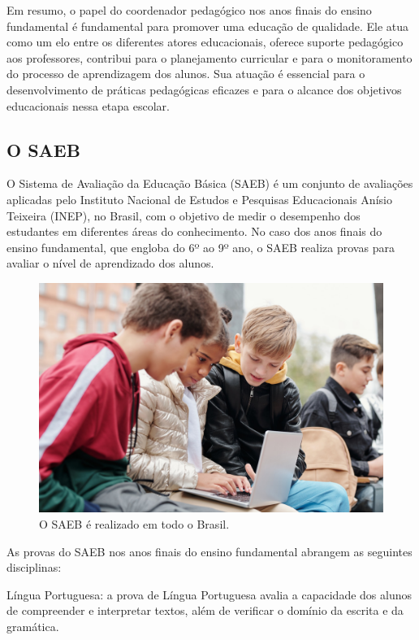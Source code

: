 Em resumo, o papel do coordenador pedagógico nos anos finais do ensino fundamental é fundamental para promover uma educação de qualidade. Ele atua como um elo entre os diferentes atores educacionais, oferece suporte pedagógico aos professores, contribui para o planejamento curricular e para o monitoramento do processo de aprendizagem dos alunos. Sua atuação é essencial para o desenvolvimento de práticas pedagógicas eficazes e para o alcance dos objetivos educacionais nessa etapa escolar.

\subsection{O SAEB}\label{o-saeb}

O Sistema de Avaliação da Educação Básica (SAEB) é um conjunto de avaliações aplicadas pelo Instituto Nacional de Estudos e Pesquisas Educacionais Anísio Teixeira (INEP), no Brasil, com o objetivo de medir o desempenho dos estudantes em diferentes áreas do conhecimento. No caso dos anos finais do ensino fundamental, que engloba do 6º ao 9º ano, o SAEB realiza provas para avaliar o nível de aprendizado dos alunos.

\begin{figure}
\centering
\includegraphics[width=\textwidth]{./imgs/Imagem002.jpg}
\caption{O SAEB é realizado em todo o Brasil.}
\end{figure}

As provas do SAEB nos anos finais do ensino fundamental abrangem as seguintes disciplinas:

Língua Portuguesa: a prova de Língua Portuguesa avalia a capacidade dos alunos de compreender e interpretar textos, além de verificar o domínio da escrita e da gramática.

